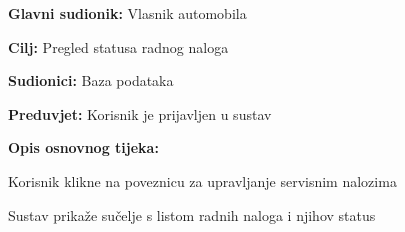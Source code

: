 					\noindent {}
					\begin{packed_item}
						
						\item \textbf{Glavni sudionik: } Vlasnik automobila
						\item  \textbf{Cilj:} Pregled statusa radnog naloga
						\item  \textbf{Sudionici:} Baza podataka
						\item  \textbf{Preduvjet:} Korisnik je prijavljen u sustav
						\item  \textbf{Opis osnovnog tijeka:}
						
						\item[] \begin{packed_enum}
							
							\item Korisnik klikne na poveznicu za upravljanje servisnim nalozima
							\item Sustav prikaže sučelje s listom radnih naloga i njihov status
							
						\end{packed_enum}
					\end{packed_item}
%	
%						
%	
%						
%						
